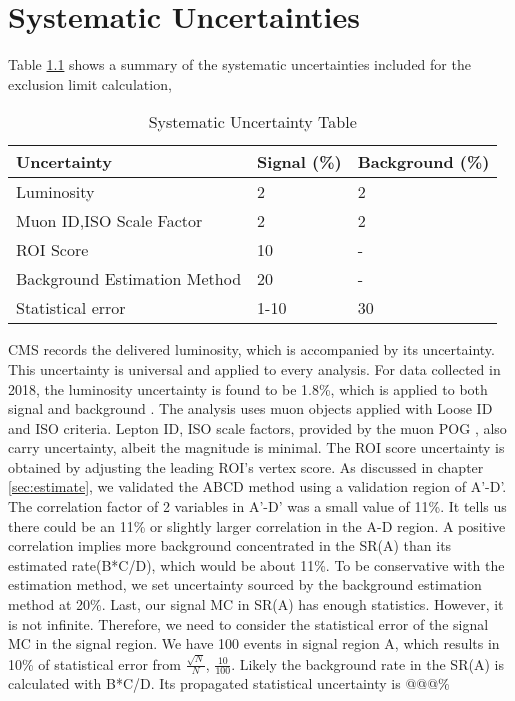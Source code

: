 \clearpage
\chapter{Systematic Uncertainties}\label{sec:systs}
Table \ref{tab:systab} shows a summary of the systematic uncertainties included for the exclusion limit calculation,

\begin{table}[htb!]
  \caption{Systematic Uncertainty Table}
  \begin{center}
    \begin{tabular}{l|l|l}\hline
     Uncertainty    & Signal (\%) & Background (\%)\\
      \hline
     Luminosity     & 2 & 2\\
      \hline
     Muon ID,ISO Scale Factor     & 2 & 2 \\
      \hline
     ROI Score      & 10 & -\\
      \hline
     Background Estimation Method     & 20 & - \\
      \hline
     Statistical error     & 1-10 & 30 \\
      \hline
    \end{tabular}
    \label{tab:systab}
  \end{center}
\end{table}
CMS records the delivered luminosity, which is accompanied by its uncertainty.
This uncertainty is universal and applied to every analysis.
For data collected in 2018, the luminosity uncertainty is found to be 1.8\%, which is applied to both signal and background \cite{lumiUnc18}.
The analysis uses muon objects applied with Loose ID and ISO criteria.
Lepton ID, ISO scale factors, provided by the muon POG \cite{muonpog}, also carry uncertainty, albeit the magnitude is minimal.
The ROI score uncertainty is obtained by adjusting the leading ROI's vertex score.
As discussed in chapter \ref{sec:estimate}, we validated the ABCD method using a validation region of A'-D'.
The correlation factor of 2 variables in A'-D' was a small value of 11\%.
It tells us there could be an 11\% or slightly larger correlation in the A-D region.
A positive correlation implies more background concentrated in the SR(A) than its estimated rate(B*C/D), which would be about 11\%.
To be conservative with the estimation method, we set uncertainty sourced by the background estimation method at 20\%.
Last, our signal MC in SR(A) has enough statistics.
However, it is not infinite.
Therefore, we need to consider the statistical error of the signal MC in the signal region.
We have 100 events in signal region A, which results in 10\% of statistical error from $\frac{\sqrt{N}}{N}$, $\frac{10}{100}$.
Likely the background rate in the SR(A) is calculated with B*C/D.
Its propagated statistical uncertainty is @@@\%
